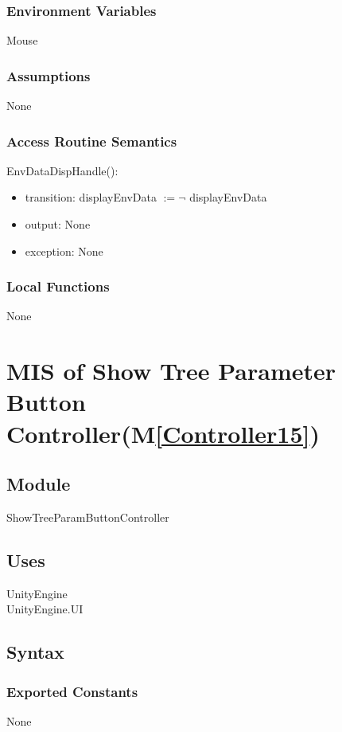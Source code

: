 \documentclass[12pt, titlepage]{article}
\newcommand{\mref}[1]{M\ref{#1}}
\begin{document}
\subsubsection{Environment Variables}
Mouse
\subsubsection{Assumptions}
None
\subsubsection{Access Routine Semantics}

\noindent EnvDataDispHandle():
\begin{itemize}
\item transition: displayEnvData $\mathit {:= \neg}$ displayEnvData
\item output: None
\item exception: None
\end{itemize}

\subsubsection{Local Functions}
None

\newpage

\section{MIS of Show Tree Parameter Button Controller(\mref{Controller15})}  

\subsection{Module}

ShowTreeParamButtonController

\subsection{Uses}
UnityEngine\\
UnityEngine.UI\\

\subsection{Syntax}

\subsubsection{Exported Constants}
None
\end{document}
